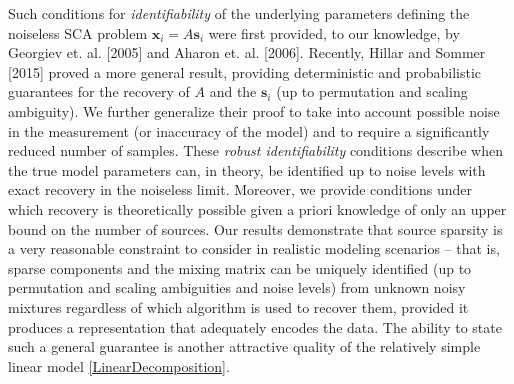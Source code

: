 \documentclass[journal,onecolumn]{IEEEtran}
\begin{document}
Such conditions for \emph{identifiability} of the underlying parameters defining the noiseless SCA problem $\mathbf{x}_i = A\mathbf{s}_i$ were first provided, to our knowledge, by Georgiev et. al. [2005] and Aharon et. al. [2006]. Recently, Hillar and Sommer [2015] proved a more general result, providing deterministic and probabilistic guarantees for the recovery of $A$ and the $\mathbf{s}_i$ (up to permutation and scaling ambiguity). We further generalize their proof to take into account possible noise in the measurement (or inaccuracy of the model) and to require a significantly reduced number of samples. These \emph{robust identifiability} conditions describe when the true model parameters can, in theory, be identified up to noise levels with exact recovery in the noiseless limit. Moreover, we provide conditions under which recovery is theoretically possible given a priori knowledge of only an upper bound on the number of sources. Our results demonstrate that source sparsity is a very reasonable constraint to consider in realistic modeling scenarios -- that is, sparse components and the mixing matrix can be uniquely identified (up to permutation and scaling ambiguities and noise levels) from unknown noisy mixtures regardless of which algorithm is used to recover them, provided it produces a representation that adequately encodes the data. The ability to state such a general guarantee is another attractive quality of the relatively simple linear model \eqref{LinearDecomposition}.
\end{document}
